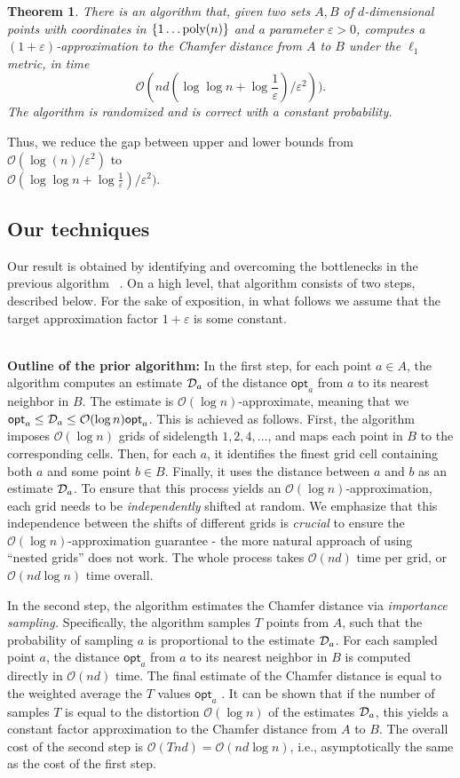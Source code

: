 \documentclass[11pt]{article}
\newcommand{\eps}{\varepsilon}
\theoremstyle{plain}
\newtheorem{theorem}{Theorem}[section]
\newcommand{\OO}{\mathcal{O}}
\newcommand{\opt}{\mathsf{opt}}
\begin{document}
\begin{theorem}
\label{t:main}
    There is an algorithm that, given two sets $A, B$ of $d$-dimensional points with coordinates in 
    $\{1 \ldots \mbox{{\rm poly}}(n) \}$ and a parameter $\eps>0$, computes a $(1+\eps)$-approximation to the Chamfer distance from $A$ to $B$ under the $\ell_1$ metric,  in time  \[ \OO(nd(\log\log n+\log\frac{1}{\eps})/\eps^2)) .\]
   The algorithm is randomized and is correct with a constant probability.
\end{theorem}

Thus, we reduce the gap between upper and lower bounds from $\OO(\log (n)/\eps^2)$ to \\ $\OO(\log\log n +\log\frac{1}{\eps})/\eps^2)$.


\subsection{Our techniques}
Our result is obtained by identifying and overcoming the bottlenecks in the previous algorithm ~\cite{BIJ24}. On a high level, that algorithm consists of two steps, described below. For the sake of exposition, in what follows we assume that the target approximation factor $1+\eps$ is some constant.


\ \\
{\bf Outline of the prior algorithm:} In the first step, for each point $a \in A$, the algorithm computes an estimate $\mathcal{D}_a$ of the distance $\opt_a$ from $a$ to its nearest neighbor in $B$. The estimate is $\OO(\log n)$-approximate, meaning that we  $\opt_a \le \calD_a \le \OO(\log n) \opt_a$. This is achieved as follows. First,  the algorithm imposes $\OO(\log n)$ grids of sidelength $1,2, 4, \ldots$, and maps each point in $B$ to the corresponding cells. Then, for each $a$, it identifies the finest grid cell containing both $a$ and some point $b \in B$.
Finally, it uses the distance between $a$ and $b$ as an estimate $\mathcal{D}_a$. To ensure that this process yields an $\OO(\log n)$-approximation, each grid needs to be {\em independently} shifted at random. We emphasize that this independence between the shifts of different grids is {\em crucial} to ensure the $\OO(\log n)$-approximation guarantee - the more natural approach of using ``nested grids'' does not work. The whole process takes $\OO(nd)$ time per grid, or $\OO(nd \log n)$ time overall.

In the second step, the algorithm estimates the Chamfer distance via {\em importance sampling.} Specifically, the algorithm samples $T$ points from $A$, such that the probability of sampling $a$ is proportional to the estimate $\mathcal{D}_a$. For each sampled point $a$, the distance $\opt_a$ from $a$ to its nearest neighbor in $B$ is computed directly in $\OO(nd)$ time. The final estimate of the Chamfer distance is equal to the weighted average the $T$ values $\opt_a$ . It can be shown that if the number of samples $T$ is equal to the distortion $\OO(\log n)$ of the estimates $\mathcal{D}_a$, this yields a constant factor approximation to the Chamfer distance from $A$ to $B$. The overall cost of the second step is $\OO(T nd) = \OO(nd \log n)$, i.e., asymptotically the same as the cost of the first step. 
\end{document}
